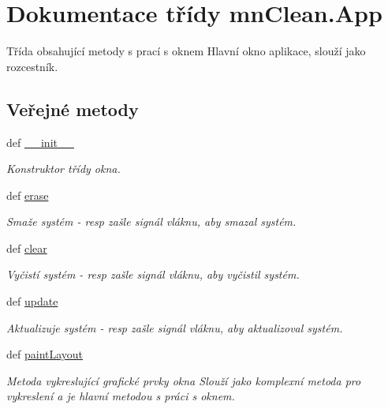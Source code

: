 \hypertarget{classmnClean_1_1App}{\section{Dokumentace třídy mn\-Clean.\-App}
\label{dc/dd1/classmnClean_1_1App}
}


Třída obsahující metody s prací s oknem Hlavní okno aplikace, slouží jako rozcestník.  


\subsection*{Veřejné metody}
\begin{DoxyCompactItemize}
\item 
def \hyperlink{classmnClean_1_1App_a931a30b2de92a4244b7c14adb54a65b4}{\-\_\-\-\_\-init\-\_\-\-\_\-}
\begin{DoxyCompactList}\small\item\em Konstruktor třídy okna. \end{DoxyCompactList}\item 
def \hyperlink{classmnClean_1_1App_aff635cca8d9951ee777f6a5804c3feff}{erase}
\begin{DoxyCompactList}\small\item\em Smaže systém -\/ resp zašle signál vláknu, aby smazal systém. \end{DoxyCompactList}\item 
def \hyperlink{classmnClean_1_1App_a7f88384497c1aec6b34293edb587209e}{clear}
\begin{DoxyCompactList}\small\item\em Vyčistí systém -\/ resp zašle signál vláknu, aby vyčistil systém. \end{DoxyCompactList}\item 
def \hyperlink{classmnClean_1_1App_aa2c2d530936cfd44307b73a2a8759642}{update}
\begin{DoxyCompactList}\small\item\em Aktualizuje systém -\/ resp zašle signál vláknu, aby aktualizoval systém. \end{DoxyCompactList}\item 
def \hyperlink{classmnClean_1_1App_af3ba2608854c91607c2a194b478d194b}{paint\-Layout}
\begin{DoxyCompactList}\small\item\em Metoda vykreslující grafické prvky okna Slouží jako komplexní metoda pro vykreslení a je hlavní metodou s práci s oknem. \end{DoxyCompactList}\item 

\end{DoxyCompactItemize}
